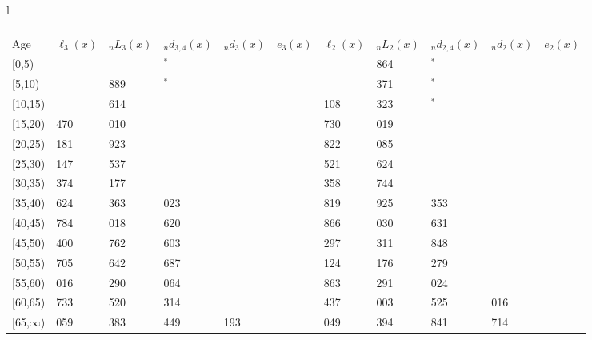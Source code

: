 \documentclass[
]{article}
\begin{document}
\begin{table}
\centering
\begin{tabular}[t]{l}
\hline
\begin{tabular}{>{\raggedright\arraybackslash}p{.43in}>{\raggedleft\arraybackslash}p{.42in}>{\raggedleft\arraybackslash}p{.42in}>{\raggedleft\arraybackslash}p{.42in}>{\raggedleft\arraybackslash}p{.42in}>{\raggedleft\arraybackslash}p{.42in}>{\raggedleft\arraybackslash}p{.42in}>{\raggedleft\arraybackslash}p{.42in}>{\raggedleft\arraybackslash}p{.42in}>{\raggedleft\arraybackslash}p{.42in}>{\raggedleft\arraybackslash}p{.42in}}
\toprule
\multicolumn{1}{c}{ } & \multicolumn{5}{c}{(2) Lost mother only} & \multicolumn{5}{c}{(3) Lost father only} \\
\cmidrule(l{3pt}r{3pt}){2-6} \cmidrule(l{3pt}r{3pt}){7-11}
Age & $\ell_{3}(x)$ & ${}_nL_{3}(x)$ & ${}_nd_{3,4}(x)$ & ${}_nd_{3}(x)$ & $e_{3}(x)$ & $\ell_{2}(x)$ & ${}_nL_{2}(x)$ & ${}_nd_{2,4}(x)$ & ${}_nd_{2}(x)$ & $e_{2}(x)$\\
\midrule
{}[0,5) & 0 & 721 & 9$^{*}$ & 1 & 4 & 0 & 1 864 & 3$^{*}$ & 2 & 11\\
{}[5,10) & 382 & 2 889 & 26$^{*}$ & 0 & 4 & 947 & 7 371 & 30$^{*}$ & 1 & 11\\
{}[10,15) & 883 & 5 614 & 37 & 1 & 4 & 2 108 & 14 323 & 33$^{*}$ & 2 & 11\\
{}[15,20) & 1 470 & 9 010 & 171 & 3 & 4 & 3 730 & 24 019 & 73 & 8 & 11\\
{}[20,25) & 2 181 & 13 923 & 230 & 8 & 3 & 5 822 & 37 085 & 195 & 21 & 11\\
\addlinespace
{}[25,30) & 3 147 & 19 537 & 290 & 16 & 3 & 8 521 & 52 624 & 420 & 42 & 11\\
{}[30,35) & 4 374 & 26 177 & 716 & 29 & 3 & 11 358 & 71 744 & 828 & 80 & 10\\
{}[35,40) & 5 624 & 32 363 & 1 023 & 48 & 3 & 14 819 & 93 925 & 1 353 & 138 & 9\\
{}[40,45) & 6 784 & 40 018 & 1 620 & 78 & 3 & 18 866 & 116 030 & 2 631 & 228 & 8\\
{}[45,50) & 8 400 & 46 762 & 2 603 & 131 & 2 & 22 297 & 136 311 & 3 848 & 381 & 7\\
\addlinespace
{}[50,55) & 8 705 & 46 642 & 3 687 & 193 & 2 & 25 124 & 147 176 & 7 279 & 610 & 6\\
{}[55,60) & 8 016 & 41 290 & 4 064 & 258 & 1 & 24 863 & 142 291 & 9 024 & 891 & 5\\
{}[60,65) & 6 733 & 32 520 & 4 314 & 300 & 1 & 21 437 & 110 003 & 11 525 & 1 016 & 3\\
{}[65,$\infty$) & 4 059 & 43 383 & 8 449 & 2 193 & 1 & 13 049 & 172 394 & 25 841 & 8 714 & 2\\

\end{tabular}
\end{tabular}
\end{table}
\end{document}
